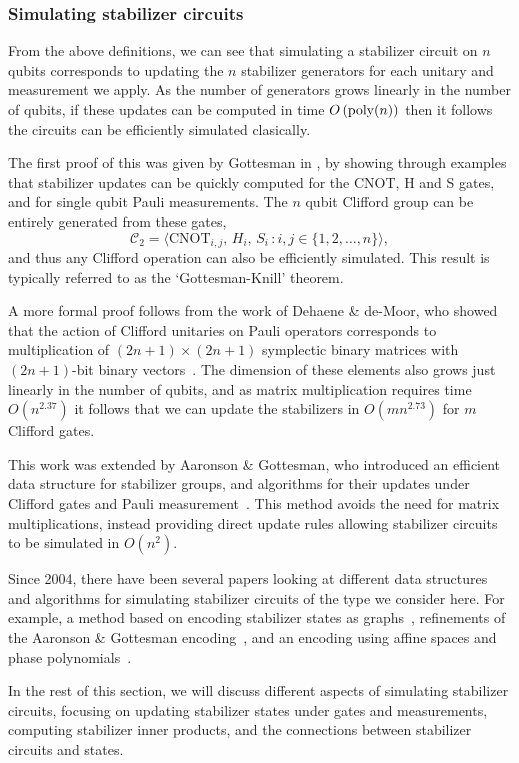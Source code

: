 \subsubsection*{Simulating stabilizer circuits}
From the above definitions, we can see that simulating a stabilizer circuit on $n$ qubits corresponds to updating the $n$ stabilizer generators for each unitary and measurement we apply. As the number of generators grows linearly in the number of qubits, if these updates can be computed in time $O\left(\text{poly} (n)\right)$ then it follows the circuits can be efficiently simulated clasically.\par
The first proof of this was given by Gottesman in \cite{Gottesman1998b}, by showing through examples that stabilizer updates can be quickly computed for the CNOT, H and S gates, and for single qubit Pauli measurements. The $n$ qubit Clifford group can be entirely generated from these gates,
\begin{equation}
    \mathcal{C}_{2} = \langle \text{CNOT}_{i,j},\, H_{i},\, S_{i}\,:i,j\in \{1,2,\dots,n\}\rangle, \label{eq:cliffordgen}
\end{equation}
and thus any Clifford operation can also be efficiently simulated. This result is typically referred to as the `Gottesman-Knill' theorem.\par
A more formal proof follows from the work of Dehaene \& de-Moor, who showed that the action of Clifford unitaries on Pauli operators corresponds to multiplication of $(2n+1)\times (2n+1)$ symplectic binary matrices with $(2n+1)$-bit binary vectors~\cite{Dehaene2003}. The dimension of these elements also grows just linearly in the number of qubits, and as matrix multiplication requires time $O(n^{2.37})$ it follows that we can update the stabilizers in $O(mn^{2.73})$ for $m$ Clifford gates.\par
This work was extended by Aaronson \& Gottesman, who introduced an efficient data structure for stabilizer groups, and algorithms for their updates under Clifford gates and Pauli measurement~\cite{Aaronson2004}. This method avoids the need for matrix multiplications, instead providing direct update rules allowing stabilizer circuits to be simulated in $O(n^{2})$.\par
Since 2004, there have been several papers looking at different data structures and algorithms for simulating stabilizer circuits of the type we consider here. For example, a method based on encoding stabilizer states as graphs~\cite{Anders2006}, refinements of the Aaronson \& Gottesman encoding~\cite{Garcia2012}, and an encoding using affine spaces and phase polynomials~\cite{VandenNest2008,Bravyi2016}.\par
In the rest of this section, we will discuss different aspects of simulating stabilizer circuits, focusing on updating stabilizer states under gates and measurements, computing stabilizer inner products, and the connections between stabilizer circuits and states.
